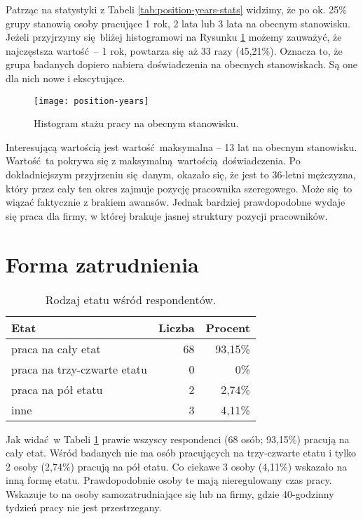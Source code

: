 Patrząc na statystyki z Tabeli \ref{tab:position-years-stats} widzimy, że po ok. 25\% grupy stanowią osoby pracujące 1 rok, 2 lata lub 3 lata na obecnym stanowisku. Jeżeli przyjrzymy się bliżej histogramowi na Rysunku \ref{fig:position-years} możemy zauważyć, że najczęstsza wartość -- 1 rok, powtarza się aż 33 razy (45,21\%). Oznacza to, że grupa badanych dopiero nabiera doświadczenia na obecnych stanowiskach. Są one dla nich nowe i ekscytujące.

\begin{figure}[h]
\begin{center}
\texttt{[image: position-years]}
\end{center}
\caption{Histogram stażu pracy na obecnym stanowisku.}
\label{fig:position-years}
\end{figure}

Interesującą wartością jest wartość maksymalna -- 13 lat na obecnym stanowisku. Wartość ta pokrywa się z maksymalną wartością doświadczenia. Po dokładniejszym przyjrzeniu się danym, okazało się, że jest to 36-letni mężczyzna, który przez cały ten okres zajmuje pozycję pracownika szeregowego. Może się to wiązać faktycznie z brakiem awansów. Jednak bardziej prawdopodobne wydaje się praca dla firmy, w której brakuje jasnej struktury pozycji pracowników.

\section{Forma zatrudnienia}

\begin{table}[h!]
\begin{center}
\begin{tabular}{l r r}
Etat & Liczba & Procent \\ \hline
praca na cały etat & 68 & 93,15\% \\
praca na trzy-czwarte etatu & 0 & 0\% \\
praca na pół etatu & 2 & 2,74\% \\
inne & 3 & 4,11\% \\
\end{tabular}
\end{center}
\caption{Rodzaj etatu wśród respondentów.}
\label{tab:work-time-stats}
\end{table}

Jak widać w Tabeli \ref{tab:work-time-stats} prawie wszyscy respondenci (68 osób; 93,15\%) pracują na cały etat. Wśród badanych nie ma osób pracujących na trzy-czwarte etatu i tylko 2 osoby (2,74\%) pracują na pół etatu. Co ciekawe 3 osoby (4,11\%) wskazało na inną formę etatu. Prawdopodobnie osoby te mają nieregulowany czas pracy. Wskazuje to na osoby samozatrudniające się lub na firmy, gdzie 40-godzinny tydzień pracy nie jest przestrzegany.

